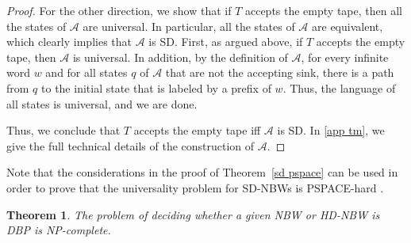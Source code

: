 \documentclass[10pt,a4paper]{amsart}
\newtheorem{thm}{Theorem}[section]
\theoremstyle{definition}
\numberwithin{equation}{section}
\newcommand{\A}{{\mathcal A}}
\begin{document}
\begin{proof}
For the other direction, we show that if $T$ accepts the empty tape, then all the states of $\A$ are universal. In particular, all the states of $\A$ are equivalent, which clearly implies that $\A$ is SD. First, as argued above, if $T$ accepts the empty tape, then $\A$ is universal. In addition, by the definition of $\A$, for every infinite word $w$ and for all states $q$ of $\A$ that are not the accepting sink, there is a path from $q$ to the initial state that is labeled by a prefix of $w$. Thus, the language of all states is universal, and we are done.


Thus, we conclude that $T$ accepts the empty tape iff $\A$ is SD.
In \autoref{app tm}, we give the full technical details of the construction of $\A$.
\end{proof}


Note that the considerations in the proof of Theorem~\ref{sd pspace} can be used in order to prove that the universality problem for SD-NBWs is PSPACE-hard \cite{AK23}.


 \begin{thm}\label{NPC Buchi DBP}
	The problem of deciding whether a given NBW or HD-NBW is DBP is NP-complete.
\end{thm}
\end{document}
